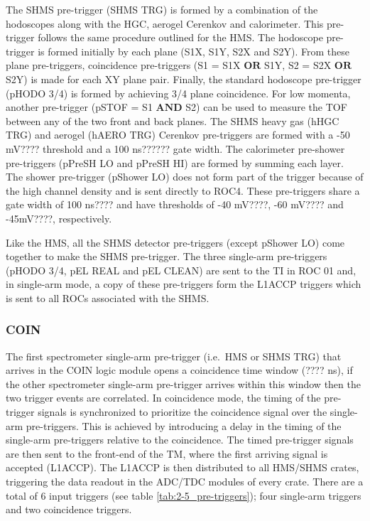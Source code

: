 \documentclass[
]{report}
\begin{document}
The SHMS pre-trigger (SHMS TRG) is formed by a combination of the
hodoscopes along with the HGC, aerogel Cerenkov and calorimeter. This
pre-trigger follows the same procedure outlined for the HMS. The
hodoscope pre-trigger is formed initially by each plane (S1X, S1Y, S2X
and S2Y). From these plane pre-triggers, coincidence pre-triggers (S1 =
S1X \(\textbf{OR}\) S1Y, S2 = S2X \(\textbf{OR}\) S2Y) is made for each
XY plane pair. Finally, the standard hodoscope pre-trigger (pHODO 3/4)
is formed by achieving 3/4 plane coincidence. For low momenta, another
pre-trigger (pSTOF = S1 \(\textbf{AND}\) S2) can be used to measure the
TOF between any of the two front and back planes. The SHMS heavy gas
(hHGC TRG) and aerogel (hAERO TRG) Cerenkov pre-triggers are formed with
a -50 mV???? threshold and a 100 ns?????? gate width. The calorimeter
pre-shower pre-triggers (pPreSH LO and pPreSH HI) are formed by summing
each layer. The shower pre-trigger (pShower LO) does not form part of
the trigger because of the high channel density and is sent directly to
ROC4. These pre-triggers share a gate width of 100 ns???? and have
thresholds of -40 mV????, -60 mV???? and -45mV????, respectively.

Like the HMS, all the SHMS detector pre-triggers (except pShower LO)
come together to make the SHMS pre-trigger. The three single-arm
pre-triggers (pHODO 3/4, pEL REAL and pEL CLEAN) are sent to the TI in
ROC 01 and, in single-arm mode, a copy of these pre-triggers form the
L1ACCP triggers which is sent to all ROCs associated with the SHMS.

\hypertarget{coin}{%
\subsubsection{COIN}\label{coin}}



The first spectrometer single-arm pre-trigger (i.e.~HMS or SHMS TRG)
that arrives in the COIN logic module opens a coincidence time window
(???? ns), if the other spectrometer single-arm pre-trigger arrives
within this window then the two trigger events are correlated. In
coincidence mode, the timing of the pre-trigger signals is synchronized
to prioritize the coincidence signal over the single-arm pre-triggers.
This is achieved by introducing a delay in the timing of the single-arm
pre-triggers relative to the coincidence. The timed pre-trigger signals
are then sent to the front-end of the TM, where the first arriving
signal is accepted (L1ACCP). The L1ACCP is then distributed to all
HMS/SHMS crates, triggering the data readout in the ADC/TDC modules of
every crate. There are a total of 6 input triggers (see table
\ref{tab:2-5_pre-triggers}); four single-arm triggers and two
coincidence triggers.
\end{document}
